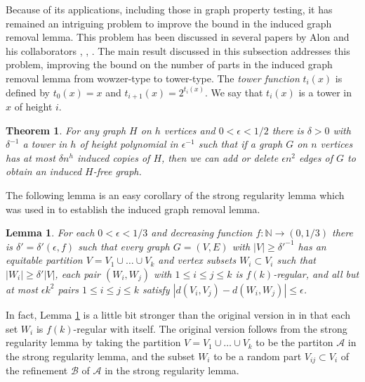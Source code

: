 \documentclass[11pt]{article}
\newtheorem{theorem}{Theorem}[section]
\newtheorem{lemma}{Lemma}[section]
\begin{document}
Because of its applications, including those in graph property testing, it has
remained an intriguing problem to improve the bound in the induced graph
removal lemma. This problem has been discussed in several papers by Alon and
his collaborators \cite{A02}, \cite{AFN}, \cite{AlSh06}. The main result
discussed in this subsection addresses this problem, improving the bound on the
number of parts in the induced graph removal lemma from wowzer-type to
tower-type. The {\it tower function} $t_i(x)$ is defined by $t_0(x)=x$ and
$t_{i+1}(x)=2^{t_i(x)}$. We say that $t_i(x)$ is a tower in $x$ of height $i$. 

\begin{theorem}\label{inducedtower}
For any graph $H$ on $h$ vertices and $0 < \epsilon< 1/2$ there is $\delta>0$ with $\delta^{-1}$ a tower in $h$ of height polynomial in $\epsilon^{-1}$ such that if a graph $G$ on $n$ vertices has
at most $\delta n^h$ induced copies of $H$, then we can add or delete $\epsilon
n^2$ edges of $G$ to obtain an induced $H$-free graph.
\end{theorem}

The following lemma is an easy corollary of the strong regularity lemma which
was used in \cite{AFKS} to establish the induced graph removal lemma.

\begin{lemma}\label{strongeasycor}
For each $0 < \epsilon < 1/3$ and decreasing function $f:\mathbb{N}\rightarrow
(0,1/3)$ there is $\delta'=\delta'(\epsilon,f)$ such that every graph $G=(V,E)$
with $|V| \geq \delta'^{-1}$ has an equitable partition $V=V_1 \cup \ldots \cup V_k$ and vertex subsets $W_i
\subset V_i$ such that $|W_i| \geq \delta' |V|$, each pair $(W_i,W_j)$ with
$1 \leq i \leq j \leq k$ is $f(k)$-regular, and all but at most $\epsilon k^2$
pairs $1 \leq i \leq j \leq k$ satisfy $|d(V_i,V_j)-d(W_i,W_j)| \leq \epsilon$.
\end{lemma}

In fact, Lemma \ref{strongeasycor} is a little bit stronger than the original
version in \cite{AFKS} in that each set $W_i$ is $f(k)$-regular with itself.
The original version follows from the strong regularity lemma by taking the
partition $V=V_1 \cup \ldots \cup V_k$ to be the partiton $\mathcal{A}$ in the
strong regularity lemma, and the subset $W_i$ to be a
random part $V_{ij} \subset V_i$ of the refinement $\mathcal{B}$ of
$\mathcal{A}$ in the strong regularity lemma.
\end{document}
